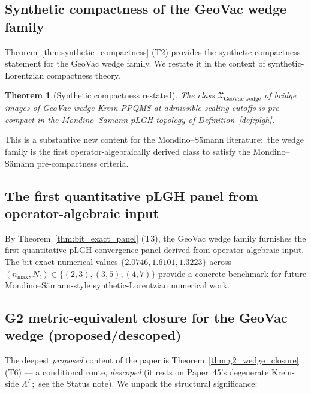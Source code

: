 \documentclass[11pt,a4paper]{article}
\theoremstyle{plain}
\newtheorem{theorem}{Theorem}[section]
\theoremstyle{definition}
\newcommand{\nmax}{n_{\max}}
\newcommand{\Nt}{N_{t}}
\newcommand{\Lprop}{\Lambda^{L}}
\begin{document}
\subsection{Synthetic compactness of the GeoVac wedge
family}\label{sec:syn_compactness_wedge}

Theorem~\ref{thm:synthetic_compactness} (T2) provides the synthetic
compactness statement for the GeoVac wedge family. We restate it in
the context of synthetic-Lorentzian compactness theory.

\begin{theorem}[Synthetic compactness restated]\label{thm:syn_compactness_restated}
The class $\mathfrak{X}_{\mathrm{GeoVac\ wedge}}$ of bridge images of
GeoVac wedge Krein PPQMS at admissible-scaling cutoffs is
pre-compact in the Mondino--S\"amann pLGH topology of
Definition~\ref{def:plgh}.
\end{theorem}

This is a substantive new content for the Mondino--S\"amann literature:\
the wedge family is the first operator-algebraically derived class to
satisfy the Mondino--S\"amann pre-compactness criteria.

\subsection{The first quantitative pLGH panel from
operator-algebraic input}\label{sec:first_quant_plgh_panel}

By Theorem~\ref{thm:bit_exact_panel} (T3), the GeoVac wedge family
furnishes the first quantitative pLGH-convergence panel derived from
operator-algebraic input. The bit-exact numerical values
$\{2.0746, 1.6101, 1.3223\}$ across $(\nmax, \Nt) \in \{(2, 3),
(3, 5), (4, 7)\}$ provide a concrete benchmark for future
Mondino--S\"amann-style synthetic-Lorentzian numerical work.

\subsection{G2 metric-equivalent closure for the GeoVac
wedge (proposed/descoped)}\label{sec:g2_wedge_closure_unpacked}

The deepest \emph{proposed} content of the paper is
Theorem~\ref{thm:g2_wedge_closure} (T6) --- a conditional route, \emph{descoped}
(it rests on Paper~45's degenerate Krein-side $\Lprop$;\ see the Status
note). We unpack the structural significance:
\end{document}
